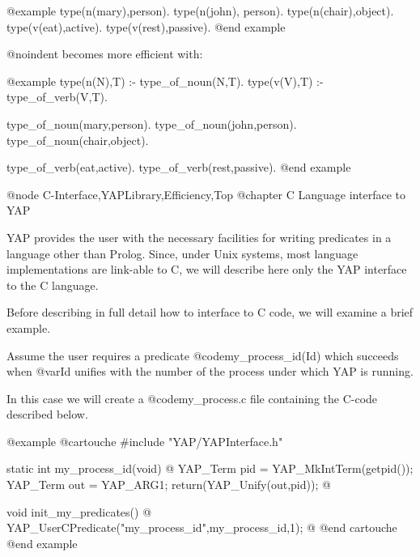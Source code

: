 {{{{{{{{{@example
type(n(mary),person).
type(n(john), person).
type(n(chair),object).
type(v(eat),active).
type(v(rest),passive).
@end example

@noindent
 becomes more efficient with:

@example
type(n(N),T) :- type_of_noun(N,T).
type(v(V),T) :- type_of_verb(V,T).

type_of_noun(mary,person).
type_of_noun(john,person).
type_of_noun(chair,object).

type_of_verb(eat,active).
type_of_verb(rest,passive).
@end example

@node C-Interface,YAPLibrary,Efficiency,Top
@chapter C Language interface to YAP

YAP provides the user with the necessary facilities for writing
predicates in a language other than Prolog. Since, under Unix systems,
most language implementations are link-able to C, we will describe here
only the YAP interface to the C language.

Before describing in full detail how to interface to C code, we will examine 
a brief example.

Assume the user requires a predicate @code{my_process_id(Id)} which succeeds
when @var{Id} unifies with the number of the process under which YAP is running.

In this case we will create a @code{my_process.c} file containing the
C-code described below.

@example
@cartouche
#include "YAP/YAPInterface.h"

static int my_process_id(void) 
@{
     YAP_Term pid = YAP_MkIntTerm(getpid());
     YAP_Term out = YAP_ARG1;
     return(YAP_Unify(out,pid));
@}

void init_my_predicates()
@{
     YAP_UserCPredicate("my_process_id",my_process_id,1);
@}
@end cartouche
@end example

}}}}}}}}}
